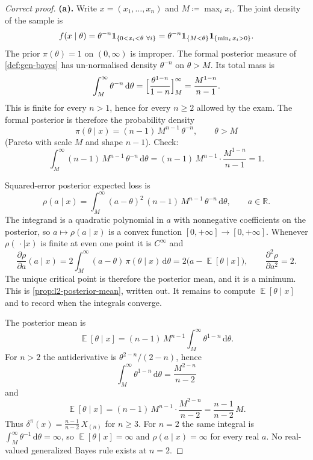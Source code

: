 \documentclass[11pt,a4paper]{article}
\DeclareMathOperator{\E}{\mathbb{E}}
\begin{document}
\begin{proof}[Correct proof]
\textbf{(a).}
Write \( x=(x_1,\dots,x_n) \) and \( M\coloneqq\max_i x_i \). The joint density of the sample is
\[
f(x\mid\theta)
=
\theta^{-n}\mathbf{1}_{\{0<x_i<\theta\ \forall i\}}
=
\theta^{-n}\mathbf{1}_{\{M<\theta\}}\mathbf{1}_{\{\min_i x_i>0\}}.
\]
The prior \( \pi(\theta)=1 \) on \( (0,\infty) \) is improper. The formal posterior measure of \cref{def:gen-bayes} has un-normalised density \( \theta^{-n} \) on \( \theta>M \). Its total mass is
\[
\int_{M}^{\infty}\theta^{-n}\,\mathrm{d}\theta
=
\Bigl[\frac{\theta^{1-n}}{1-n}\Bigr]_{M}^{\infty}
=
\frac{M^{1-n}}{n-1}.
\]
This is finite for every \( n>1 \), hence for every \( n\ge 2 \) allowed by the exam. The formal posterior is therefore the probability density
\[
\pi(\theta\mid x)
=
(n-1)\,M^{n-1}\,\theta^{-n},
\qquad
\theta>M
\]
(Pareto with scale \( M \) and shape \( n-1 \)). Check:
\[
\int_{M}^{\infty}(n-1)\,M^{n-1}\,\theta^{-n}\,\mathrm{d}\theta
=
(n-1)\,M^{n-1}\cdot\frac{M^{1-n}}{n-1}
=
1.
\]

Squared-error posterior expected loss is
\[
\rho(a\mid x)
=
\int_{M}^{\infty}(a-\theta)^{2}\,(n-1)\,M^{n-1}\,\theta^{-n}\,\mathrm{d}\theta,
\qquad
a\in\mathbb{R}.
\]
The integrand is a quadratic polynomial in \( a \) with nonnegative coefficients on the posterior, so \( a\mapsto\rho(a\mid x) \) is a convex function \( [0,+\infty]\to[0,+\infty] \). Whenever \( \rho(\,\cdot\mid x) \) is finite at even one point it is \( C^{\infty} \) and
\[
\frac{\partial\rho}{\partial a}(a\mid x)
=
2\int_{M}^{\infty}(a-\theta)\,\pi(\theta\mid x)\,\mathrm{d}\theta
=
2\bigl(a-\E[\theta\mid x]\bigr),
\qquad
\frac{\partial^{2}\rho}{\partial a^{2}}
=
2.
\]
The unique critical point is therefore the posterior mean, and it is a minimum. This is \cref{prop:l2-posterior-mean}, written out. It remains to compute \( \E[\theta\mid x] \) and to record when the integrals converge.

The posterior mean is
\[
\E[\theta\mid x]
=
(n-1)\,M^{n-1}\int_{M}^{\infty}\theta^{1-n}\,\mathrm{d}\theta.
\]
For \( n>2 \) the antiderivative is \( \theta^{2-n}/(2-n) \), hence
\[
\int_{M}^{\infty}\theta^{1-n}\,\mathrm{d}\theta
=
\frac{M^{2-n}}{n-2}
\]
and
\[
\E[\theta\mid x]
=
(n-1)\,M^{n-1}\cdot\frac{M^{2-n}}{n-2}
=
\frac{n-1}{n-2}\,M.
\]
Thus \( \delta^{\pi}(x)=\frac{n-1}{n-2}\,X_{(n)} \) for \( n\ge 3 \). For \( n=2 \) the same integral is \( \int_{M}^{\infty}\theta^{-1}\,\mathrm{d}\theta=\infty \), so \( \E[\theta\mid x]=\infty \) and \( \rho(a\mid x)=\infty \) for every real \( a \). No real-valued generalized Bayes rule exists at \( n=2 \).


\end{proof}
\end{document}
